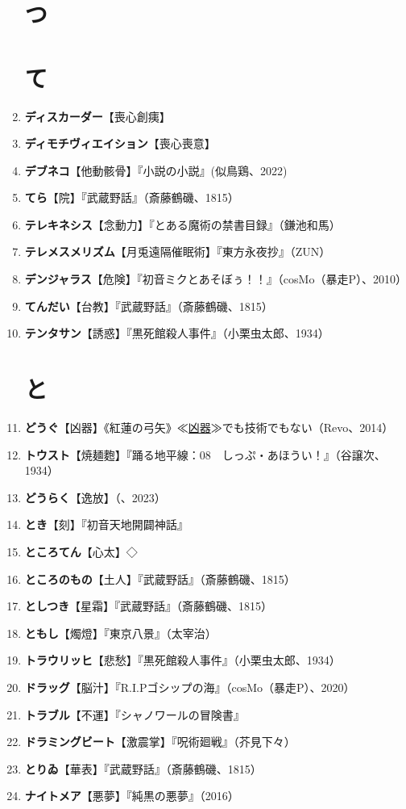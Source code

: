 \documentclass[twocolumn]{jsbook}
\newcommand{\ccite}[1]{《#1》}
\begin{document}
\begin{enumerate}
\section*{つ}
\section*{て}
    \item \textbf{ディスカーダー}【喪心創痍】
    \item \textbf{ディモチヴィエイション}【喪心喪意】
    \item \textbf{デブネコ}【他動骸骨】『小説の小説』(似鳥鶏、2022)
    \item \textbf{てら}【院】『武蔵野話』（斎藤鶴磯、1815）
    \item \textbf{テレキネシス}【念動力】『とある魔術の禁書目録』（鎌池和馬）
    \item \textbf{テレメスメリズム}【月兎遠隔催眠術】『東方永夜抄』（ZUN）
    \item \textbf{デンジャラス}【危険】『初音ミクとあそぼぅ！！』（cosMo（暴走P）、2010）
    \item \textbf{てんだい}【台教】『武蔵野話』（斎藤鶴磯、1815）
    \item \textbf{テンタサン}【誘惑】『黒死館殺人事件』（小栗虫太郎、1934）
\section*{と}
    \item \textbf{どうぐ}【凶器】\ccite{紅蓮の弓矢}{≪\uline{凶器}≫でも技術でもない（Revo、2014）}
    \item \textbf{トウスト}【焼麺麭】『踊る地平線：08　しっぷ・あほうい！』（谷譲次、1934）
    \item \textbf{どうらく}【逸放】（、2023）
    \item \textbf{とき}【刻】『初音天地開闢神話』
    \item \textbf{ところてん}【心太】◇
    \item \textbf{ところのもの}【土人】『武蔵野話』（斎藤鶴磯、1815）
    \item \textbf{としつき}【星霜】『武蔵野話』（斎藤鶴磯、1815）
    \item \textbf{ともし}【燭燈】『東京八景』（太宰治）
    \item \textbf{トラウリッヒ}【悲愁】『黒死館殺人事件』（小栗虫太郎、1934）
    \item \textbf{ドラッグ}【脳汁】『R.I.Pゴシップの海』（cosMo（暴走P）、2020）
    \item \textbf{トラブル}【不運】『シャノワールの冒険書』
    \item \textbf{ドラミングビート}【激震掌】『呪術廻戦』（芥見下々）
    \item \textbf{とりゐ}【華表】『武蔵野話』（斎藤鶴磯、1815）
    \item \textbf{ナイトメア}【悪夢】『純黒の悪夢』（2016）

\end{enumerate}
\end{document}

